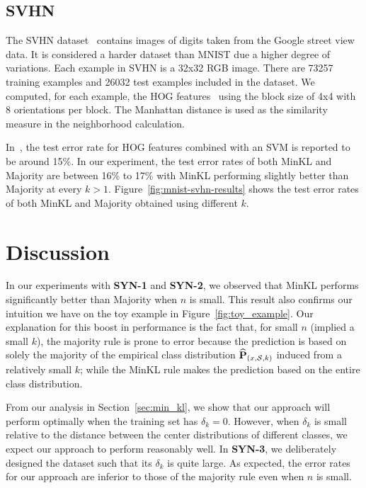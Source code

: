 \documentclass{article}
\begin{document}
\subsection{SVHN}
The SVHN dataset~\cite{Netzer2011} contains images of digits taken
from the Google street view data. It is considered a harder dataset
than MNIST due a higher degree of variations. Each example in SVHN is
a 32x32 RGB image. There are 73257 training examples and 26032 test
examples included in the dataset. We computed, for each example, the
HOG features~\cite{Dalal2005} using the block size of 4x4 with 8
orientations per block. The Manhattan distance is used as the
similarity measure in the neighborhood calculation.

In~\cite{Netzer2011}, the test error rate for HOG features combined
with an SVM is reported to be around 15\%. In our experiment, the test
error rates of both MinKL and Majority are between 16\% to 17\% with
MinKL performing slightly better than Majority at every $k >
1$. Figure~\ref{fig:mnist-svhn-results} shows the test error rates of
both MinKL and Majority obtained using different $k$.

\section{Discussion}
\label{sec:discussion}

In our experiments with \textbf{SYN-1} and \textbf{SYN-2}, we observed
that MinKL performs significantly better than Majority when $n$ is
small. This result also confirms our intuition we have on the toy
example in Figure~\ref{fig:toy_example}. Our explanation for this
boost in performance is the fact that, for small $n$ (implied a small
$k$), the majority rule is prone to error because the prediction is
based on solely the majority of the empirical class distribution
$\widehat{\mathbf{P}}_{(x,\mathcal{S},k)}$ induced from a relatively small $k$; while the MinKL
rule makes the prediction based on the entire class distribution.

From our analysis in Section~\ref{sec:min_kl}, we show that our
approach will perform optimally when the training set has $\delta_k =
0$. However, when $\delta_k$ is small relative to the distance between
the center distributions of different classes, we expect our approach
to perform reasonably well. In \textbf{SYN-3}, we deliberately
designed the dataset such that its $\delta_k$ is quite large. As
expected, the error rates for our approach are inferior to those of
the majority rule even when $n$ is small.
\end{document}

